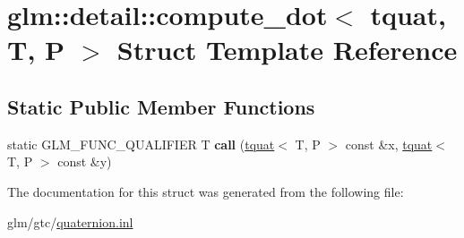 \hypertarget{structglm_1_1detail_1_1compute__dot_3_01tquat_00_01T_00_01P_01_4}{\section{glm\-:\-:detail\-:\-:compute\-\_\-dot$<$ tquat, T, P $>$ Struct Template Reference}
\label{structglm_1_1detail_1_1compute__dot_3_01tquat_00_01T_00_01P_01_4}
}
\subsection*{Static Public Member Functions}
\begin{DoxyCompactItemize}
\item 
\hypertarget{structglm_1_1detail_1_1compute__dot_3_01tquat_00_01T_00_01P_01_4_a4f27c293f2e5e43f23e019303336601e}{static G\-L\-M\-\_\-\-F\-U\-N\-C\-\_\-\-Q\-U\-A\-L\-I\-F\-I\-E\-R T {\bfseries call} (\hyperlink{structglm_1_1tquat}{tquat}$<$ T, P $>$ const \&x, \hyperlink{structglm_1_1tquat}{tquat}$<$ T, P $>$ const \&y)}\label{structglm_1_1detail_1_1compute__dot_3_01tquat_00_01T_00_01P_01_4_a4f27c293f2e5e43f23e019303336601e}

\end{DoxyCompactItemize}


The documentation for this struct was generated from the following file\-:\begin{DoxyCompactItemize}
\item 
glm/gtc/\hyperlink{gtc_2quaternion_8inl}{quaternion.\-inl}\end{DoxyCompactItemize}
